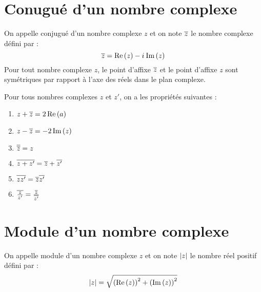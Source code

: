 \section{Conugué d'un nombre complexe}
\begin{defi}
	On appelle conjugué d’un nombre complexe \(z\) et on note \(\overline{z}\) le nombre complexe défini par : \[\overline{z} = \operatorname{Re}\left(z\right) -i\mkern1mu \operatorname{Im}\left(z\right)\]
	Pour tout nombre complexe \(z\), le point d’affixe \(\overline{z}\) et le point d’affixe \(z\) sont symétriques par rapport à l’axe des réels dans le plan complexe.
\end{defi}

\begin{defprop}
	Pour tous nombres complexes \(z\) et \(z'\), on a les propriétés suivantes :
	\begin{enumerate}
		\item \(z+\overline{z} = 2 \operatorname{Re}\left(a\right)\)\\
		\item \(z-\overline{z} = -2 \operatorname{Im}\left(z\right)\) \\
		\item \(\overline{\overline{z}} = z \)\\
		\item \(\overline{z+z'} = \overline{z}+\overline{z'}\)\\
		\item \(\overline{zz'} = \overline{z} \overline{z'} \)\\
		\item \(\overline{\frac{z}{z'}} = \frac{\overline{z}}{\overline{z'}}\)
	\end{enumerate}
\end{defprop}

\section{Module d'un nombre complexe}
\begin{defprop}
	On appelle module d’un nombre complexe \(z\) et on note \(\left\lvert z\right\rvert\) le nombre réel positif défini par : \[\left\lvert z\right\rvert = \sqrt{ \left(\operatorname{Re}\left(z\right)\right)^2+\left(\operatorname{Im}\left(z\right)\right)^2}\]
\end{defprop}

